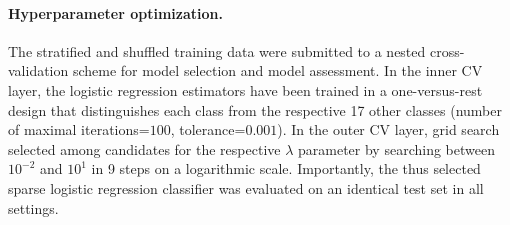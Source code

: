 \documentclass{article}
\begin{document}
\paragraph{Hyperparameter optimization.}
The stratified and shuffled training data were submitted
to a nested cross-validation scheme
for model selection and model assessment.
In the inner CV layer, the logistic regression estimators
have been trained in a one-versus-rest design that
distinguishes each class from
the respective 17 other classes
(number of maximal iterations=$100$, tolerance=$0.001$).
In the outer CV layer, grid search
selected among candidates for the respective $\lambda$ parameter
by searching between $10^{-2}$ and $10^{1}$ in 9 steps on a logarithmic scale.
Importantly, the thus selected sparse logistic regression classifier was
evaluated on an identical test set in all settings.
\end{document}
